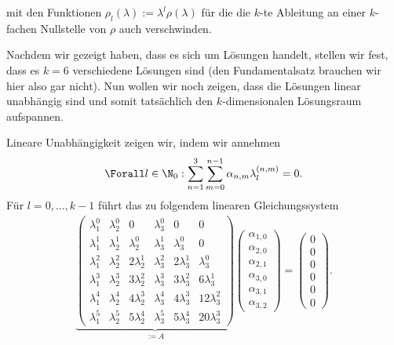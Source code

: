 \begin{solution}
\begin{enumerate}[label = \textbf{\alph*)}]
  mit den Funktionen $\rho_l (\lambda) := \lambda^l \rho(\lambda)$ für die die $k$-te Ableitung an einer $k$-fachen Nullstelle von $\rho$ auch verschwinden.

  Nachdem wir gezeigt haben, dass es sich um Lösungen handelt, stellen wir fest, dass es $k=6$ verschiedene Lösungen sind (den Fundamentalsatz brauchen wir hier also gar nicht). Nun wollen wir noch zeigen, dass die Lösungen linear unabhängig sind und somit tatsächlich den $k$-dimensionalen Lösungsraum aufspannen.

  Lineare Unabhängigkeit zeigen wir, indem wir annehmen
  \begin{align*}
    \Forall l \in \N_0: \sum_{n=1}^3 \sum_{m=0}^{n-1} \alpha_{n,m} \lambda_{l}^{(n,m)} = 0 .
  \end{align*}
  Für $l=0,...,k-1$ führt das zu folgendem linearen Gleichungssystem
  \begin{align*}
    \underbrace{\begin{pmatrix}
      \lambda_1^0 & \lambda_2^0 & 0 & \lambda_3^0 & 0 & 0\\
      \lambda_1^1 & \lambda_2^1 & \lambda_2^0 & \lambda_3^1 & \lambda_3^0 & 0\\
      \lambda_1^2 & \lambda_2^2 & 2\lambda_2^1 & \lambda_3^2 & 2\lambda_3^1 & \lambda_3^0\\
      \lambda_1^3 & \lambda_2^3 & 3\lambda_2^2 & \lambda_3^3 & 3\lambda_3^2 & 6\lambda_3^1\\
      \lambda_1^4 & \lambda_2^4 & 4\lambda_2^3 & \lambda_3^4 & 4\lambda_3^3 & 12\lambda_3^2\\
      \lambda_1^5 & \lambda_2^5 & 5\lambda_2^4 & \lambda_3^5 & 5\lambda_3^4 & 20\lambda_3^3
    \end{pmatrix}}_{:=A}
    \begin{pmatrix}
      \alpha_{1,0} \\ \alpha_{2,0} \\ \alpha_{2,1} \\ \alpha_{3,0}  \\ \alpha_{3,1}  \\ \alpha_{3,2}
    \end{pmatrix} =
    \begin{pmatrix}
      0 \\ 0 \\ 0 \\ 0 \\ 0 \\ 0
    \end{pmatrix}.
  \end{align*}

\end{enumerate}
\end{solution}
